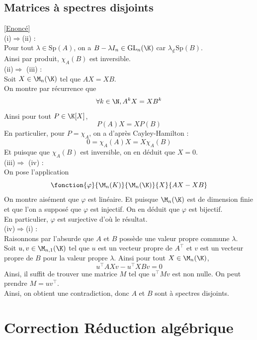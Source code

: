 \documentclass[8pt]{book}
\begin{document}
	\subsection{Matrices à spectres disjoints}
	\label{Matrices à spectres disjoints corrigé}
	\textcolor{blue}{\hyperref[Matrices à spectres disjoints]{[Enoncé]}}\\
	\textbullet (i)$\Longrightarrow$(ii) :\\
	Pour tout $\lambda \in \text{Sp}(A)$, on a $B-\lambda I_n \in \text{GL}_n(\K)$ car $\lambda_\not\in \text{Sp}(B)$.\\
	Ainsi par produit, $\chi_A(B)$ est inversible.	\\
	\textbullet (ii)$\Longrightarrow$ (iii) :\\
	Soit $X\in \M_n(\K)$ tel que $AX=XB$.\\
	On montre par récurrence que \[\forall k\in\N, A^kX=XB^k\]
	Ainsi pour tout $P\in\K[X]$, \[P(A)X=XP(B)\]
	En particulier, pour $P=\chi_A$, on a d'après Cayley-Hamilton : \[0=\chi_A(A)X=X\chi_A(B)\]
	Et puisque que $\chi_A(B)$ est inversible, on en déduit que $X=0$.\\
	\textbullet (iii)$\Longrightarrow$ (iv) :\\
	On pose l'application \[\fonction{\varphi}{\M_n(K)}{\M_n(\K)}{X}{AX-XB}\]
	On montre aisément que $\varphi$ est linéaire. Et puisque $\M_n(\K)$ est de dimension finie et que l'on a supposé que $\varphi$ est injectif. On en déduit que $\varphi$ est bijectif.\\
	En particulier, $\varphi$ est surjective d'où le résultat.\\
	\textbullet (iv)$\Longrightarrow$(i) :\\ 
	Raisonnons par l'absurde que $A$ et $B$ possède une valeur propre commune $\lambda$.\\
	Soit $u,v\in \M_{n,1}(\K)$ tel que $u$ est un vecteur propre de $A^\top$ et $v$ est un vecteur propre de $B$ pour la valeur propre $\lambda$.
	Ainsi pour tout $X\in \M_n(\K)$, \[u^\top AXv-u^\top XBv=0\]
	Ainsi, il suffit de trouver une matrice $M$ tel que $u^\top M v$ est non nulle. On peut prendre $M=uv^\top$.\\
	Ainsi, on obtient une contradiction, donc $A$ et $B$ sont à spectres disjoints. 
	\newpage

\section{Correction Réduction algébrique}
\end{document}
